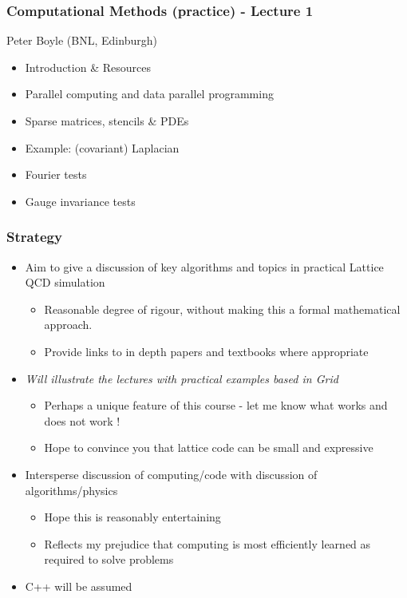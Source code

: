 \documentclass[pdf,ps,8pt]{beamer}
\begin{document}
\begin{frame}[fragile]\small\frametitle{ Computational Methods (practice) -  Lecture 1    }

  \begin{center}
  
    {\color{red} Peter Boyle} (BNL, Edinburgh)
  
  \begin{itemize}
  \item Introduction \& Resources
  \item Parallel computing and data parallel programming
  \item Sparse matrices, stencils \& PDEs
  \item Example: (covariant) Laplacian
  \item Fourier tests
  \item Gauge invariance tests
  \end{itemize}

\end{center}  
\end{frame}

\begin{frame}[fragile]\small\frametitle{ Strategy  }

  \begin{itemize}
    \item Aim to give a discussion of key algorithms and topics in practical Lattice QCD simulation
    \begin{itemize}
    \item Reasonable degree of rigour, without making this a formal mathematical approach.
    \item Provide links to in depth papers and textbooks where appropriate
    \end{itemize}
    \item \emph{Will illustrate the lectures with practical examples based in Grid}
    \begin{itemize}
    \item Perhaps a unique feature of this course - let me know what works and does not work !
    \item Hope to convince you that lattice code can be small and expressive
    \end{itemize}
    \item Intersperse discussion of computing/code with discussion of algorithms/physics
    \begin{itemize}
    \item Hope this is reasonably entertaining
    \item Reflects my prejudice that computing is most efficiently learned as required to solve problems
    \end{itemize}
    \item C++ will be assumed
    \end{itemize}
\end{frame}
\end{document}

